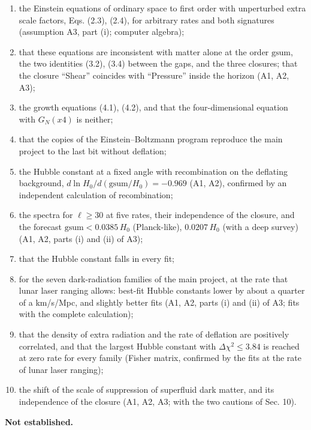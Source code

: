 \documentclass[
  10pt,
]{article}
\providecommand{\tightlist}{%
  \setlength{\itemsep}{0pt}\setlength{\parskip}{0pt}}
\begin{document}
\begin{enumerate}
\def\labelenumi{\arabic{enumi}.}
\tightlist
\item
  the Einstein equations of ordinary space to first order with
  unperturbed extra scale factors, Eqs. (2.3), (2.4), for arbitrary
  rates and both signatures (assumption A3, part (i); computer algebra);
\item
  that these equations are inconsistent with matter alone at the order
  \(\mathrm{gsum}\), the two identities (3.2), (3.4) between the gaps,
  and the three closures; that the closure ``Shear'' coincides with
  ``Pressure'' inside the horizon (A1, A2, A3);
\item
  the growth equations (4.1), (4.2), and that the four-dimensional
  equation with \(G_N(x4)\) is neither;
\item
  that the copies of the Einstein--Boltzmann program reproduce the main
  project to the last bit without deflation;
\item
  the Hubble constant at a fixed angle with recombination on the
  deflating background, \(d\ln H_0/d(\mathrm{gsum}/H_0)=-0.969\) (A1,
  A2), confirmed by an independent calculation of recombination;
\item
  the spectra for \(\ell\ge30\) at five rates, their independence of the
  closure, and the forecast \(\mathrm{gsum}<0.0385\,H_0\) (Planck-like),
  \(0.0207\,H_0\) (with a deep survey) (A1, A2, parts (i) and (ii) of
  A3);
\item
  that the Hubble constant falls in every fit;
\item
  for the seven dark-radiation families of the main project, at the rate
  that lunar laser ranging allows: best-fit Hubble constants lower by
  about a quarter of a km/s/Mpc, and slightly better fits (A1, A2, parts
  (i) and (ii) of A3; fits with the complete calculation);
\item
  that the density of extra radiation and the rate of deflation are
  positively correlated, and that the largest Hubble constant with
  \(\Delta\chi^2\le3.84\) is reached at zero rate for every family
  (Fisher matrix, confirmed by the fits at the rate of lunar laser
  ranging);
\item
  the shift of the scale of suppression of superfluid dark matter, and
  its independence of the closure (A1, A2, A3; with the two cautions of
  Sec. 10).
\end{enumerate}

\textbf{Not established.}
\end{document}
